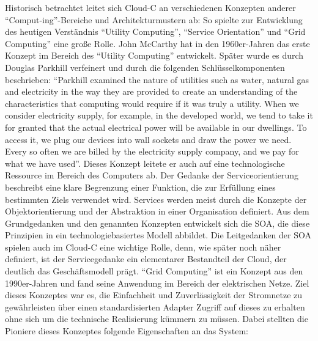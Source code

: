 Historisch betrachtet leitet sich \ac{Cloud-C} an verschiedenen Konzepten anderer \enquote{Comput-ing}-Bereiche und Architekturmustern ab: So spielte zur Entwicklung des heutigen Verständnis \enquote{Utility Computing}, \enquote{Service Orientation} und \enquote{Grid Computing} eine große Rolle.\autocite[vgl.][S.3-5]{hill_guide_2013} John McCarthy hat in den 1960er-Jahren das erste Konzept im Bereich des \enquote{Utility Computing} entwickelt.\autocite[vgl.][]{mccarthy_reminiscences_1983} Später wurde es durch Douglas Parkhill verfeinert und durch die folgenden Schlüsselkomponenten beschrieben: \enquote{Parkhill examined the nature of utilities such as water, natural gas and electricity in the way they are provided to create an understanding of the characteristics that computing would require if it was truly a utility. When we consider electricity supply, for example, in the developed world, we tend to take it for granted that the actual electrical power will be available in our dwellings. To access it, we plug our devices into wall sockets and draw the power we need. Every so often we are billed by the electricity supply company, and we pay for what we have used}.\autocite[vgl.][]{parkhill_challenge_1966} Dieses Konzept leitete er auch auf eine technologische Ressource im Bereich des Computers ab.\autocite[vgl.][S.4]{hill_guide_2013} Der Gedanke der Serviceorientierung beschreibt eine klare Begrenzung einer Funktion, die zur Erfüllung eines bestimmten Ziels verwendet wird. Services werden meist durch die Konzepte der Objektorientierung und der Abstraktion in einer Organisation definiert. Aus dem Grundgedanken und den genannten Konzepten entwickelt sich die \ac{SOA}, die diese Prinzipien in ein technologiebasiertes Modell abbildet. Die Leitgedanken der \ac{SOA} spielen auch im \ac{Cloud-C} eine wichtige Rolle, denn, wie später noch näher definiert, ist der Servicegedanke ein elementarer Bestandteil der Cloud, der deutlich das Geschäftsmodell prägt. \enquote{Grid Computing} ist ein Konzept aus den 1990er-Jahren und fand seine Anwendung im Bereich der elektrischen Netze.\autocite[vgl.][]{weinhardt_cloud_2009} Ziel dieses Konzeptes war es, die Einfachheit und Zuverlässigkeit der Stromnetze zu gewährleisten über einen standardisierten Adapter Zugriff auf dieses zu erhalten ohne sich um die technische Realisierung kümmern zu müssen. Dabei stellten die Pioniere dieses Konzeptes folgende Eigenschaften\autocite[vgl.][]{foster_grid_1999} an das System:

